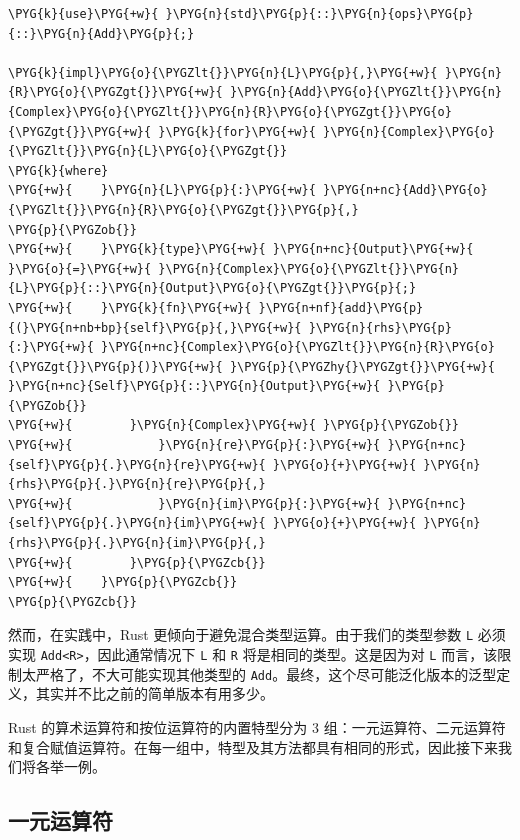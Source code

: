 \begin{Verbatim}[commandchars=\\\{\},breaklines=true,breakanywhere=true,fontsize=\codefont,xleftmargin=17bp]
\PYG{k}{use}\PYG{+w}{ }\PYG{n}{std}\PYG{p}{::}\PYG{n}{ops}\PYG{p}{::}\PYG{n}{Add}\PYG{p}{;}

\PYG{k}{impl}\PYG{o}{\PYGZlt{}}\PYG{n}{L}\PYG{p}{,}\PYG{+w}{ }\PYG{n}{R}\PYG{o}{\PYGZgt{}}\PYG{+w}{ }\PYG{n}{Add}\PYG{o}{\PYGZlt{}}\PYG{n}{Complex}\PYG{o}{\PYGZlt{}}\PYG{n}{R}\PYG{o}{\PYGZgt{}}\PYG{o}{\PYGZgt{}}\PYG{+w}{ }\PYG{k}{for}\PYG{+w}{ }\PYG{n}{Complex}\PYG{o}{\PYGZlt{}}\PYG{n}{L}\PYG{o}{\PYGZgt{}}
\PYG{k}{where}
\PYG{+w}{    }\PYG{n}{L}\PYG{p}{:}\PYG{+w}{ }\PYG{n+nc}{Add}\PYG{o}{\PYGZlt{}}\PYG{n}{R}\PYG{o}{\PYGZgt{}}\PYG{p}{,}
\PYG{p}{\PYGZob{}}
\PYG{+w}{    }\PYG{k}{type}\PYG{+w}{ }\PYG{n+nc}{Output}\PYG{+w}{ }\PYG{o}{=}\PYG{+w}{ }\PYG{n}{Complex}\PYG{o}{\PYGZlt{}}\PYG{n}{L}\PYG{p}{::}\PYG{n}{Output}\PYG{o}{\PYGZgt{}}\PYG{p}{;}
\PYG{+w}{    }\PYG{k}{fn}\PYG{+w}{ }\PYG{n+nf}{add}\PYG{p}{(}\PYG{n+nb+bp}{self}\PYG{p}{,}\PYG{+w}{ }\PYG{n}{rhs}\PYG{p}{:}\PYG{+w}{ }\PYG{n+nc}{Complex}\PYG{o}{\PYGZlt{}}\PYG{n}{R}\PYG{o}{\PYGZgt{}}\PYG{p}{)}\PYG{+w}{ }\PYG{p}{\PYGZhy{}\PYGZgt{}}\PYG{+w}{ }\PYG{n+nc}{Self}\PYG{p}{::}\PYG{n}{Output}\PYG{+w}{ }\PYG{p}{\PYGZob{}}
\PYG{+w}{        }\PYG{n}{Complex}\PYG{+w}{ }\PYG{p}{\PYGZob{}}
\PYG{+w}{            }\PYG{n}{re}\PYG{p}{:}\PYG{+w}{ }\PYG{n+nc}{self}\PYG{p}{.}\PYG{n}{re}\PYG{+w}{ }\PYG{o}{+}\PYG{+w}{ }\PYG{n}{rhs}\PYG{p}{.}\PYG{n}{re}\PYG{p}{,}
\PYG{+w}{            }\PYG{n}{im}\PYG{p}{:}\PYG{+w}{ }\PYG{n+nc}{self}\PYG{p}{.}\PYG{n}{im}\PYG{+w}{ }\PYG{o}{+}\PYG{+w}{ }\PYG{n}{rhs}\PYG{p}{.}\PYG{n}{im}\PYG{p}{,}
\PYG{+w}{        }\PYG{p}{\PYGZcb{}}
\PYG{+w}{    }\PYG{p}{\PYGZcb{}}
\PYG{p}{\PYGZcb{}}
\end{Verbatim}

然而，在实践中，Rust 更倾向于避免混合类型运算。由于我们的类型参数 \texttt{L} 必须实现 \texttt{Add<R>}，因此通常情况下 \texttt{L} 和 \texttt{R} 将是相同的类型。这是因为对 \texttt{L} 而言，该限制太严格了，不大可能实现其他类型的 \texttt{Add}。最终，这个尽可能泛化版本的泛型定义，其实并不比之前的简单版本有用多少。

Rust 的算术运算符和按位运算符的内置特型分为 3 组：一元运算符、二元运算符和复合赋值运算符。在每一组中，特型及其方法都具有相同的形式，因此接下来我们将各举一例。

\subsection{一元运算符}

